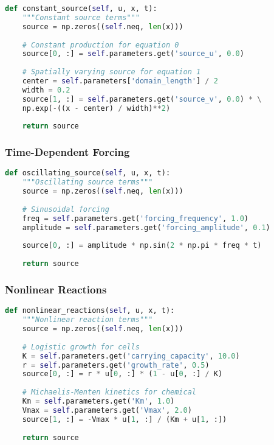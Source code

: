 \begin{lstlisting}[language=Python, caption=Constant Source Terms]
	def constant_source(self, u, x, t):
	"""Constant source terms"""
	source = np.zeros((self.neq, len(x)))
	
	# Constant production for equation 0
	source[0, :] = self.parameters.get('source_u', 0.0)
	
	# Spatially varying source for equation 1
	center = self.parameters['domain_length'] / 2
	width = 0.2
	source[1, :] = self.parameters.get('source_v', 0.0) * \
	np.exp(-((x - center) / width)**2)
	
	return source
\end{lstlisting}

\subsubsection{Time-Dependent Forcing}

\begin{lstlisting}[language=Python, caption=Time-Dependent Source Terms]
	def oscillating_source(self, u, x, t):
	"""Oscillating source terms"""
	source = np.zeros((self.neq, len(x)))
	
	# Sinusoidal forcing
	freq = self.parameters.get('forcing_frequency', 1.0)
	amplitude = self.parameters.get('forcing_amplitude', 0.1)
	
	source[0, :] = amplitude * np.sin(2 * np.pi * freq * t)
	
	return source
\end{lstlisting}

\subsubsection{Nonlinear Reactions}

\begin{lstlisting}[language=Python, caption=Nonlinear Reaction Terms]
	def nonlinear_reactions(self, u, x, t):
	"""Nonlinear reaction terms"""
	source = np.zeros((self.neq, len(x)))
	
	# Logistic growth for cells
	K = self.parameters.get('carrying_capacity', 10.0)
	r = self.parameters.get('growth_rate', 0.5)
	source[0, :] = r * u[0, :] * (1 - u[0, :] / K)
	
	# Michaelis-Menten kinetics for chemical
	Km = self.parameters.get('Km', 1.0)
	Vmax = self.parameters.get('Vmax', 2.0)
	source[1, :] = -Vmax * u[1, :] / (Km + u[1, :])
	
	return source
\end{lstlisting}

